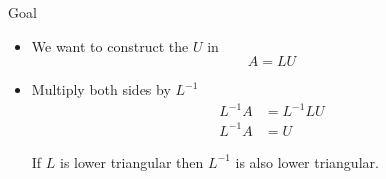 \documentclass[10pt]{beamer}
\begin{document}

\begin{frame}{Goal}

\begin{itemize}
    \item We want to construct the $U$ in $$A=LU$$ 

    \item Multiply both sides by $L^{-1}$
        \begin{align*} 
        L^{-1}A&=L^{-1}LU\\
        L^{-1}A&=U
        \end{align*}

    \begin{theorem}
        If $L$ is lower triangular then $L^{-1}$ is also lower triangular.
    \end{theorem}
\end{itemize}

\end{frame}

\end{document}
